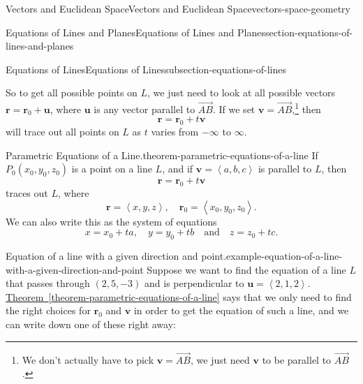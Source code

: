 \documentclass[oneside,10pt,]{book}
\numberwithin{equation}{section}
\newcommand{\RR}{\mathbb{R}}
\newcommand{\vv}[1]{\mathbf{#1}}
\newcommand{\dotprod}[1]{\left\langle #1 \right\rangle}
\begin{document}
\begin{chapterptx}{Vectors and Euclidean Space}{}{Vectors and Euclidean Space}{}{}{vectors-space-geometry}
\begin{sectionptx}{Equations of Lines and Planes}{}{Equations of Lines and Planes}{}{}{section-equations-of-lines-and-planes}
\begin{subsectionptx}{Equations of Lines}{}{Equations of Lines}{}{}{subsection-equations-of-lines}
\begin{figure}
{
}
\end{figure}
\hypertarget{p-1203}{}%
So to get all possible points on \(L\), we just need to look at all possible vectors \(\vv{r} = \vv{r}_{0}+\vv{u}\), where \(\vv{u}\) is any vector parallel to \(\vec{AB}\). If we set \(\vv{v} = \vec{AB}\),\footnote{We don't actually have to pick \(\vv{v} = \vec{AB}\), we just need \(\vv{v}\) to be parallel to \(\vec{AB}\).\label{fn-6}} then%
%
\begin{equation*}
\vv{r} = \vv{r}_{0}+t\vv{v}
\end{equation*}
\hypertarget{p-1204}{}%
will trace out all points on \(L\) as \(t\) varies from \(-\infty\) to \(\infty\).%
\begin{theorem}{Parametric Equations of a Line.}{}{theorem-parametric-equations-of-a-line}%
\index{lines!parametric equations in \(\RR^{3}\)}\hypertarget{p-1205}{}%
If \(P_{0}(x_{0},y_{0},z_{0})\) is a point on a line \(L\), and if \(\vv{v} = \dotprod{a,b,c}\) is parallel to \(L\), then%
%
\begin{equation*}
\vv{r} = \vv{r}_{0}+t\vv{v}
\end{equation*}
\hypertarget{p-1206}{}%
traces out \(L\), where%
%
\begin{equation*}
\vv{r} = \dotprod{x,y,z},\quad\vv{r}_{0} = \dotprod{x_{0},y_{0},z_{0}}.
\end{equation*}
\hypertarget{p-1207}{}%
We can also write this as the system of equations%
%
\begin{equation*}
x = x_{0}+ta,\quad y=y_{0}+tb\quad\text{and}\quad z = z_{0}+tc.
\end{equation*}
\end{theorem}
\begin{example}{Equation of a line with a given direction and point.}{example-equation-of-a-line-with-a-given-direction-and-point}%
\hypertarget{p-1208}{}%
Suppose we want to find the equation of a line \(L\) that passes through \((2,5,-3)\) and is perpendicular to \(\vv{u} = \dotprod{2,1,2}\). \hyperref[theorem-parametric-equations-of-a-line]{Theorem~\ref{theorem-parametric-equations-of-a-line}} says that we only need to find the right choices for \(\vv{r}_{0}\) and \(\vv{v}\) in order to get the equation of such a line, and we can write down one of these right away:%

\end{example}
\end{subsectionptx}
\end{sectionptx}
\end{chapterptx}
\end{document}
